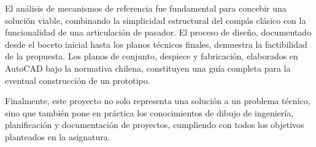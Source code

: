 \documentclass[11pt, a4paper]{article}
\begin{document}
El análisis de mecanismos de referencia fue fundamental para concebir una solución viable, combinando la simplicidad estructural del compás clásico con la funcionalidad de una articulación de pasador. El proceso de diseño, documentado desde el boceto inicial hasta los planos técnicos finales, demuestra la factibilidad de la propuesta. Los planos de conjunto, despiece y fabricación, elaborados en AutoCAD bajo la normativa chilena, constituyen una guía completa para la eventual construcción de un prototipo.

Finalmente, este proyecto no solo representa una solución a un problema técnico, sino que también pone en práctica los conocimientos de dibujo de ingeniería, planificación y documentación de proyectos, cumpliendo con todos los objetivos planteados en la asignatura.

\printbibliography[title={Bibliografía}]
\end{document}
